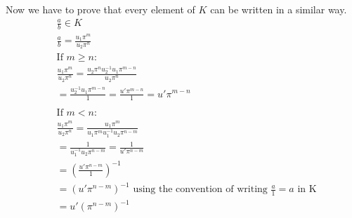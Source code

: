 \documentclass[11pt]{article}
\begin{document}
{  Now we have to prove that every element of $K$ can be written in a similar way.
  \begin{align*}
     & \frac{a}{b} \in K                                                                                  \\
     & \frac{a}{b} = \frac{u_1\pi ^m}{u_2 \pi ^n}                                                         \\
     & \text{If $m \geq n$:}                                                                              \\
     & \frac{u_1\pi ^m}{u_2 \pi ^n} = \frac{u_2 \pi ^ n u_2^{-1}u_1\pi ^{m-n}}{u_2 \pi ^n}                \\
     & = \frac{u_2^{-1}u_1\pi ^{m-n}}{1} = \frac{u'\pi ^{m-n}}{1} = u'\pi ^{m-n}                          \\
     &                                                                                                    \\
     & \text{If $m < n$:}                                                                                 \\
     & \frac{u_1\pi ^m}{u_2 \pi ^n} = \frac{u_1\pi ^m}{u_1 \pi ^m u_1^{-1} u_2 \pi ^{n-m}}                \\
     & =\frac{1}{u_1^{-1} u_2 \pi ^{n-m}} = \frac{1}{u' \pi ^{n-m}}                                       \\
     & = \left( \frac{u' \pi ^{n-m}}{1} \right)^{-1}                                                      \\
     & = \left( u' \pi ^{n-m} \right)^{-1} \text{ using the convention of writing $\frac{a}{1} = a$ in K} \\
     & = u' \left( \pi ^{n-m} \right) ^{-1}
  \end{align*}
}
\end{document}
